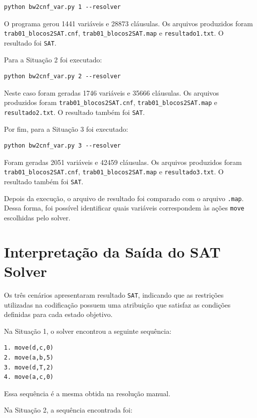 \documentclass{article}
\begin{document}
\begin{verbatim}
python bw2cnf_var.py 1 --resolver
\end{verbatim}

O programa gerou 1441 variáveis e 28873 cláusulas. Os arquivos produzidos foram \texttt{trab01\_blocos2SAT.cnf}, \texttt{trab01\_blocos2SAT.map} e \texttt{resultado1.txt}. O resultado foi \texttt{SAT}.

Para a Situação 2 foi executado:

\begin{verbatim}
python bw2cnf_var.py 2 --resolver
\end{verbatim}

Neste caso foram geradas 1746 variáveis e 35666 cláusulas. Os arquivos produzidos foram \texttt{trab01\_blocos2SAT.cnf}, \texttt{trab01\_blocos2SAT.map} e \texttt{resultado2.txt}. O resultado também foi \texttt{SAT}.

Por fim, para a Situação 3 foi executado:

\begin{verbatim}
python bw2cnf_var.py 3 --resolver
\end{verbatim}

Foram geradas 2051 variáveis e 42459 cláusulas. Os arquivos produzidos foram \texttt{trab01\_blocos2SAT.cnf}, \texttt{trab01\_blocos2SAT.map} e \texttt{resultado3.txt}. O resultado também foi \texttt{SAT}.

Depois da execução, o arquivo de resultado foi comparado com o arquivo \texttt{.map}. Dessa forma, foi possível identificar quais variáveis correspondem às ações \texttt{move} escolhidas pelo solver.

\section{Interpretação da Saída do SAT Solver}

Os três cenários apresentaram resultado \texttt{SAT}, indicando que as restrições utilizadas na codificação possuem uma atribuição que satisfaz as condições definidas para cada estado objetivo.

Na Situação 1, o solver encontrou a seguinte sequência:

\begin{verbatim}
1. move(d,c,0)
2. move(a,b,5)
3. move(d,T,2)
4. move(a,c,0)
\end{verbatim}

Essa sequência é a mesma obtida na resolução manual.

Na Situação 2, a sequência encontrada foi:
\end{document}
